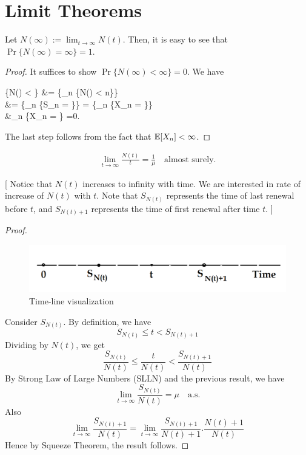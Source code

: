 \documentclass[a4paper,10pt, english]{article}
\begin{document}
\section{Limit Theorems}

\begin{lem}
	Let $N(\infty) := \lim_{t \to \infty} N(t)$. Then, it is easy to see that $\Pr\{N(\infty) = \infty\} = 1$.	
\end{lem}

\begin{proof}
	It suffices to show $\Pr\{N(\infty) < \infty\} = 0$. We have
	\begin{flalign*}
	\Pr\{N(\infty) < \infty\} &= \Pr\{\bigcup_{n \in \N} \{N(\infty) < n\}\}\\
	&= \Pr\{\bigcup_{n \in \N} \{S_n = \infty\}\} = \Pr\{\bigcup_{n \in \N} \{X_n = \infty\}\} \\
	&\leq \sum_{n \in \N}\Pr\{X_n = \infty\} =0.
	\end{flalign*}
	The last step follows from the fact that $\mathbb{E}[X_n] < \infty$.
\end{proof}

\begin{thm}
	\begin{align*}
	\lim_{t \to \infty} \frac{N(t)}{t} = \frac{1}{\mu} \quad \mbox{almost surely}.
	\end{align*}
\end{thm}
[
Notice that $N(t)$ increases to infinity with time. We are interested in rate of increase of $N(t)$ with $t$. Note that $S_{N(t)}$ represents the time of last renewal before $t$, and $S_{N(t)+1}$ represents the time of first renewal after time $t$. ] \\

\begin{proof}
	\begin{figure}[h!]
		\includegraphics[width=\linewidth]{Figures/lecture_5_fig_1.png}
		\caption{Time-line visualization}
	\end{figure}
	Consider $S_{N(t)}$. By definition, we have
	\[S_{N(t)} \leq t < S_{N(t)+1}\]
	Dividing by $N(t)$, we get 
	\[\frac{S_{N(t)}}{N(t)} \leq \frac{t}{N(t)} < \frac{S_{N(t)+1}}{N(t)}\]
	By Strong Law of Large Numbers (SLLN) and the previous result, we have
	\[\lim_{t \to \infty}\frac{S_{N(t)}}{N(t)} = \mu \quad \mbox{a.s.}\] 
	Also
	\[\lim_{t \to \infty} \frac{S_{N(t)+1}}{N(t)} = \lim_{t \to \infty} \frac{S_{N(t)+1}}{N(t)+1}.\frac{N(t)+1}{N(t)} \]
	Hence by Squeeze Theorem, the result follows.
\end{proof}
\end{document}
